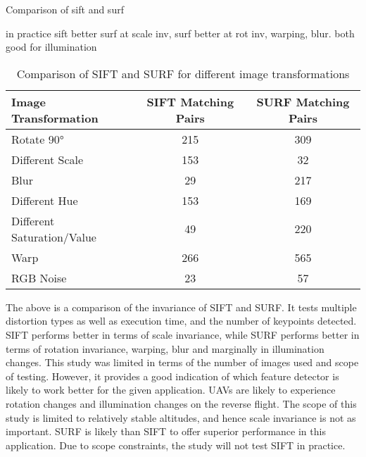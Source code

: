 Comparison of sift and surf







in practice sift better surf at scale inv, surf better at rot inv, warping, blur. both good for illumination


\begin{table}[H]
    \centering
    \caption{Comparison of SIFT and SURF for different image transformations}
    \begin{tabular}{|l|c|c|}
    \hline
    \textbf{Image Transformation} & \textbf{SIFT Matching Pairs} & \textbf{SURF Matching Pairs} \\ \hline
    Rotate 90°                    & 215                          & 309                          \\ \hline
    Different Scale               & 153                          & 32                           \\ \hline
    Blur                          & 29                           & 217                          \\ \hline
    Different Hue                 & 153                          & 169                          \\ \hline
    Different Saturation/Value    & 49                           & 220                          \\ \hline
    Warp                          & 266                          & 565                          \\ \hline
    RGB Noise                     & 23                           & 57                           \\ \hline
    \end{tabular}
    \label{tab:sift_surf_comparison}
    \end{table}
    


The above is a comparison of the invariance of SIFT and SURF. It tests multiple distortion types as well as execution time, and the number of keypoints detected. SIFT performs better in terms of scale invariance, while SURF performs better in terms of rotation invariance, warping, blur and marginally in illumination changes. This study was limited in terms of the number of images used and scope of testing. However, it provides a good indication of which feature detector is likely to work better for the given application. UAVs are likely to experience rotation changes and illumination changes on the reverse flight. The scope of this study is limited to relatively stable altitudes, and hence scale invariance is not as important. SURF is likely than SIFT to offer superior performance in this application. Due to scope constraints, the study will not test SIFT in practice. 






